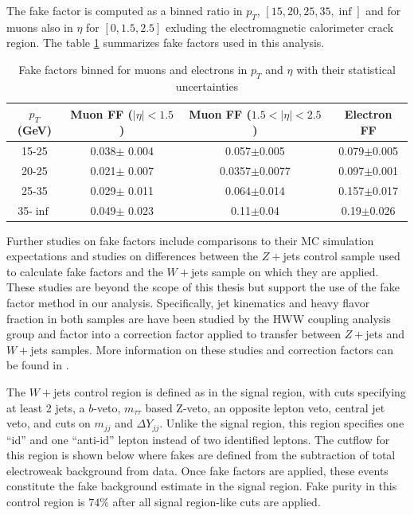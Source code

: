 The fake factor is computed as a binned ratio in $p_T$, $[15,20,25,35,\inf]$ and for muons also in $\eta$ for $[0,1.5,2.5]$ exluding the electromagnetic calorimeter crack region. The table \ref{tab:FakeFactors} summarizes fake factors used in this analysis.

\begin{table}[tb]
\centering
\caption{Fake factors binned for muons and electrons in $p_T$ and $\eta$ with their statistical uncertainties}
\label{tab:FakeFactors}
\begin{tabular}{c|c|c|c}
$p_T$(GeV) & Muon FF ($|\eta|<1.5$) & Muon FF ($1.5<|\eta|<2.5$) & Electron FF \\
\hline
15-25 & 0.038$\pm$ 0.004 & 0.057$\pm$0.005 & 0.079$\pm$0.005 \\
20-25 & 0.021$\pm$ 0.007 & 0.0357$\pm$0.0077 & 0.097$\pm$0.001 \\
25-35 & 0.029$\pm$ 0.011 & 0.064$\pm$0.014 & 0.157$\pm$0.017 \\
35-$\inf$ & 0.049$\pm$ 0.023 & 0.11$\pm$0.04 & 0.19$\pm$0.026 \\
\end{tabular}
\end{table}

Further studies on fake factors include comparisons to their MC simulation expectations and studies on differences between the $Z+$jets control sample used to calculate fake factors and the $W+$jets sample on which they are applied. These studies are beyond the scope of this thesis but support the use of the fake factor method in our analysis. Specifically, jet kinematics and heavy flavor fraction in both samples are have been studied by the HWW coupling analysis group and factor into a correction factor applied to transfer between $Z+$jets and $W+$jets samples. More information on these studies and correction factors can be found in \cite{Aaboud_2019}.

The $W+$jets control region is defined as in the signal region, with cuts specifying at least 2 jets, a $b$-veto, $m_{\tau\tau}$ based Z-veto, an opposite lepton veto, central jet veto, and cuts on $m_{jj}$ and $\Delta Y_{jj}$. Unlike the signal region, this region specifies one ``id'' and one ``anti-id'' lepton instead of two identified leptons. The cutflow for this region is shown below where fakes are defined from the subtraction of total electroweak background from data. Once fake factors are applied, these events constitute the fake background estimate in the signal region. Fake purity in this control region is $74\%$ after all signal region-like cuts are applied.


